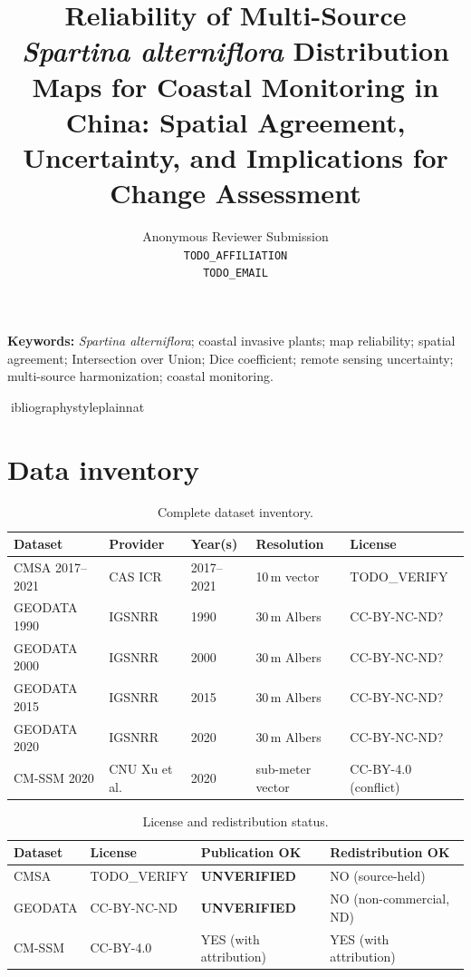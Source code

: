 \documentclass[11pt]{article}
\title{Reliability of Multi-Source \textit{Spartina alterniflora} Distribution Maps
for Coastal Monitoring in China: Spatial Agreement, Uncertainty, and Implications
for Change Assessment}
\author{Anonymous Reviewer Submission \\
\texttt{TODO_AFFILIATION \\ TODO_EMAIL}}
\date{}
\begin{document}
\maketitle



\textbf{Keywords:} \textit{Spartina alterniflora}; coastal invasive plants;
map reliability; spatial agreement; Intersection over Union; Dice coefficient;
remote sensing uncertainty; multi-source harmonization; coastal monitoring.

ibliographystyle{plainnat}


\appendix
\section{Data inventory}
\label{app:data}

\begin{table}[htpb]
\centering
\caption{\label{tab:data_inv}Complete dataset inventory.}
\begin{tabular}{l l l l l}
\toprule
Dataset & Provider & Year(s) & Resolution & License \\
\midrule
CMSA 2017--2021 & CAS ICR & 2017--2021 & 10\,m vector & TODO\_VERIFY \\
GEODATA 1990 & IGSNRR & 1990 & 30\,m Albers & CC-BY-NC-ND? \\
GEODATA 2000 & IGSNRR & 2000 & 30\,m Albers & CC-BY-NC-ND? \\
GEODATA 2015 & IGSNRR & 2015 & 30\,m Albers & CC-BY-NC-ND? \\
GEODATA 2020 & IGSNRR & 2020 & 30\,m Albers & CC-BY-NC-ND? \\
CM-SSM 2020 & CNU Xu et al. & 2020 & sub-meter vector & CC-BY-4.0 (conflict) \\
\bottomrule
\end{tabular}
\end{table}

\begin{table}[htpb]
\centering
\caption{\label{tab:licenses}License and redistribution status.}
\begin{tabular}{l l l l}
\toprule
Dataset & License & Publication OK & Redistribution OK \\
\midrule
CMSA & TODO\_VERIFY & \textbf{UNVERIFIED} & NO (source-held) \\
GEODATA & CC-BY-NC-ND & \textbf{UNVERIFIED} & NO (non-commercial, ND) \\
CM-SSM & CC-BY-4.0 & YES (with attribution) & YES (with attribution) \\
\bottomrule
\end{tabular}
\end{table}

\end{document}

